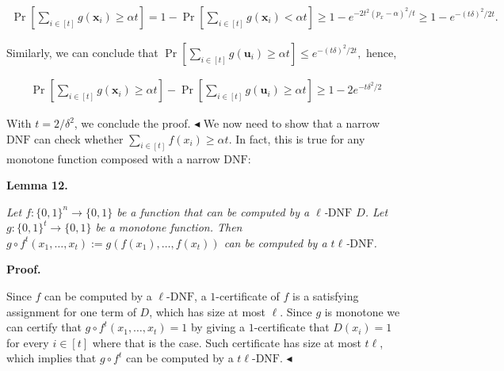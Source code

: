 \documentclass[10pt,a4paper]{article}
\begin{document}
\[\begin{gathered}
\Pr\left[\sum_{i\in[t]}g(\bm{x}_{i})\geq\alpha t\right]=1-\Pr\left[\sum_{i\in[t]}g(\bm{x}_{i})<\alpha t\right]\geq 1-e^{-2t^{2}(p_{x}-\alpha)^{2}/t}\geq 1-e^{-(t\delta)^{2}/2t}.
\end{gathered}\]




Similarly, we can conclude that
$\Pr\left[\sum_{i\in[t]}g(\bm{u}_{i})\geq\alpha t\right]\leq e^{-(t\delta)^{2}/2t},$
hence,\par


\[\begin{gathered}
\displaystyle\Pr\left[\sum_{i\in[t]}g(\bm{x}_{i})\geq\alpha t\right]-\Pr\left[\sum_{i\in[t]}g(\bm{u}_{i})\geq\alpha t\right] \displaystyle\geq 1-2e^{-t\delta^{2}/2}
\end{gathered}\]


With $t=2/\delta^{2}$, we conclude the proof.
$\blacktriangleleft$
We now need to show that a narrow $\mathrm{DNF}$ can check whether $\sum_{i\in[t]}f(x_{i})\geq\alpha t$. In fact, this is true for any monotone function composed with a narrow $\mathrm{DNF}$:\par





\par\medskip\noindent\textbf{
\textbf{Lemma 12}\textbf{.}
}\par



\emph{Let $f\colon\{0,1\}^{n}\rightarrow\{0,1\}$ be a function that can be computed by a $\ell$-$\mathrm{DNF}$ $D$. Let $g\colon\{0,1\}^{t}\to\{0,1\}$ be a monotone function.
Then $g\circ f^{t}(x_{1},\dots,x_{t}):=g(f(x_{1}),\dots,f(x_{t}))$ can be computed by a $t\ell$-$\mathrm{DNF}$.}\par







\par\medskip\noindent\textbf{Proof.}\par




Since $f$ can be computed by a $\ell$-$\mathrm{DNF}$, a $1$-certificate of $f$ is a satisfying assignment for one term of $D$, which has size at most $\ell$.
Since $g$ is monotone we can certify that $g\circ f^{t}(x_{1},\dots,x_{t})=1$ by giving a $1$-certificate that $D(x_{i})=1$ for every $i\in[t]$ where that is the case. Such certificate has size at most $t\ell$, which implies that $g\circ f^{t}$ can be computed by a $t\ell$-$\mathrm{DNF}$.
$\blacktriangleleft$\par
\end{document}
